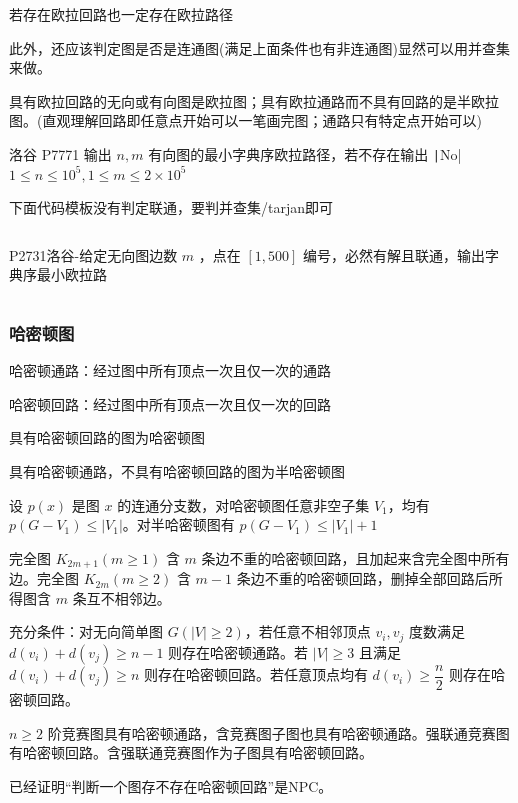 \documentclass[twocolumn,10pt]{ctexart}
\begin{document}
若存在欧拉回路也一定存在欧拉路径

此外，还应该判定图是否是连通图(满足上面条件也有非连通图)显然可以用并查集来做。

具有欧拉回路的无向或有向图是欧拉图；具有欧拉通路而不具有回路的是半欧拉图。(直观理解回路即任意点开始可以一笔画完图；通路只有特定点开始可以)

\begin{notebox}
洛谷 P7771 输出 $n,m$ 有向图的最小字典序欧拉路径，若不存在输出 \texttt|No| $1\le n\le10^5,\allowbreak{}1\le m\le2\times10^5$
\end{notebox}

下面代码模板没有判定联通，要判并查集/tarjan即可

\inputminted{cpp}{code/p7771_euler_path.cpp}

\begin{notebox}
P2731洛谷-给定无向图边数 $m$ ，点在 $[1,500]$ 编号，必然有解且联通，输出字典序最小欧拉路
\end{notebox}

\inputminted{cpp}{code/p2731_euler_path.cpp}

\subsubsection{哈密顿图}

哈密顿通路：经过图中所有顶点一次且仅一次的通路

哈密顿回路：经过图中所有顶点一次且仅一次的回路

具有哈密顿回路的图为哈密顿图

具有哈密顿通路，不具有哈密顿回路的图为半哈密顿图

设 $p(x)$ 是图 $x$ 的连通分支数，对哈密顿图任意非空子集 $V_1$，均有 $p(G-V_1)\le |V_1|$。对半哈密顿图有 $p(G-V_1)\le |V_1|+1$

完全图 $K_{2m+1}(m\ge1)$ 含 $m$ 条边不重的哈密顿回路，且加起来含完全图中所有边。完全图 $K_{2m}(m\ge 2)$ 含 $m-1$ 条边不重的哈密顿回路，删掉全部回路后所得图含 $m$ 条互不相邻边。

充分条件：对无向简单图 $G(|V|\ge 2)$，若任意不相邻顶点 $v_i,v_j$ 度数满足 $d(v_i)+d(v_j)\ge n-1$ 则存在哈密顿通路。若 $|V|\ge $3 且满足 $d(v_i)+d(v_j)\ge n$ 则存在哈密顿回路。若任意顶点均有 $d(v_i)\ge\dfrac n2$ 则存在哈密顿回路。

$n\ge 2$ 阶竞赛图具有哈密顿通路，含竞赛图子图也具有哈密顿通路。强联通竞赛图有哈密顿回路。含强联通竞赛图作为子图具有哈密顿回路。

已经证明“判断一个图存不存在哈密顿回路”是NPC。
\end{document}
